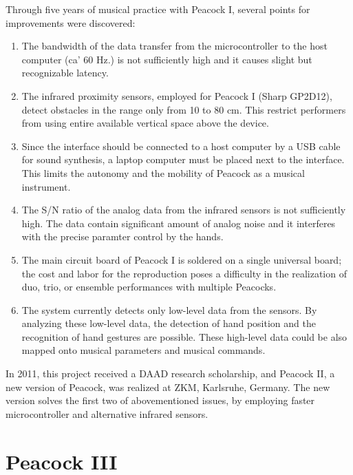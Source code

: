 \documentclass{nime-alternate}
\begin{document}
Through five years of musical practice with Peacock I, several points for improvements were discovered:

\begin{enumerate}
\item The bandwidth of the data transfer from the microcontroller to the host computer (ca' 60 Hz.) is not sufficiently high and it causes slight but recognizable latency.

\item The infrared proximity sensors, employed for Peacock I (Sharp GP2D12), detect obstacles in the range only from 10 to 80 cm. This restrict performers from using entire available vertical space above the device. 

\item Since the interface should be connected to a host computer by a USB cable for sound synthesis, a laptop computer must be placed next to the interface. This limits the autonomy and the mobility of Peacock as a musical instrument.

\item The S/N ratio of the analog data from the infrared sensors is not sufficiently high. The data contain significant amount of analog noise and it interferes with the precise paramter control by the hands.

\item The main circuit board of Peacock I is soldered on a single universal board; the cost and labor for the reproduction poses a difficulty in the realization of duo, trio, or ensemble performances with multiple Peacocks.

\item The system currently detects only low-level data from the sensors. By analyzing these low-level data, the detection of hand position and the recognition of hand gestures are possible. These high-level data could be also mapped onto musical parameters and musical commands.

\end{enumerate}

In 2011, this project received a DAAD research scholarship, and Peacock II, a new version of Peacock, was realized at ZKM, Karlsruhe, Germany. The new version solves the first two of abovementioned issues, by employing faster microcontroller\cite{parallax:propeller} and alternative infrared sensors.

\section{Peacock III}
\end{document}
